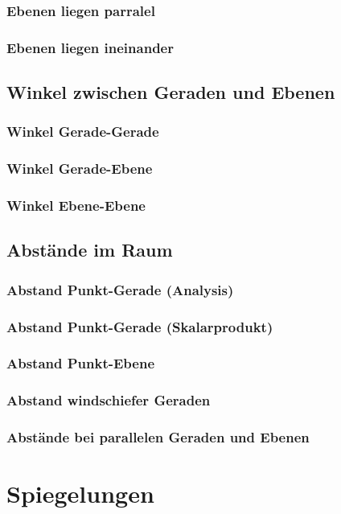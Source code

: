 \subsubsection{Ebenen liegen parralel}
\subsubsection{Ebenen liegen ineinander}
\subsection{Winkel zwischen Geraden und Ebenen}
\subsubsection{Winkel Gerade-Gerade}
\subsubsection{Winkel Gerade-Ebene}
\subsubsection{Winkel Ebene-Ebene}

\subsection{Abstände im Raum}
\subsubsection{Abstand Punkt-Gerade (Analysis)}
\subsubsection{Abstand Punkt-Gerade (Skalarprodukt)}
\subsubsection{Abstand Punkt-Ebene}
\subsubsection{Abstand windschiefer Geraden}
\subsubsection{Abstände bei parallelen Geraden und Ebenen}

\clearpage

\section{Spiegelungen}

